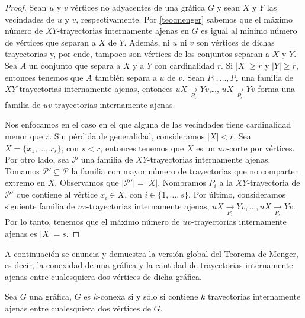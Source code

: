 \begin{proof}
    Sean $u$ y $v$ v\'ertices no adyacentes de una gr\'afica $G$ y sean $X$ y
    $Y$ las vecindades de $u$ y $v$, respectivamente. Por \cref{teo:menger}
    sabemos que el m\'aximo n\'umero de $XY$-trayectorias internamente ajenas en
    $G$ es igual al m\'inimo n\'umero de v\'ertices que separan a $X$ de $Y$.
    Adem\'as, ni $u$ ni $v$ son v\'ertices de dichas trayectorias y, por ende,
    tampoco son v\'ertices de los conjuntos separan a $X$ y $Y$. Sea  $A$ un
    conjunto que separa a $X$ y a $Y$ con cardinalidad $r$. Si $|X| \geq r$ y
    $|Y| \geq r$, entonces tenemos que $A$ tambi\'en separa a $u$ de $v$. Sean
    $P_1, \dots, P_r$ una familia de $XY$-trayectorias internamente ajenas,
    entonces $uX\xrightarrow[P_1]{}Yv$,\dots, $uX\xrightarrow[P_r]{}Yv$ forma
    una familia de $uv$-trayectorias internamente ajenas. 

    Nos enfocamos en el caso en el que alguna de las vecindades tiene
    cardinalidad menor que $r$.  Sin p\'erdida de generalidad, consideramos
    $|X|<r$. Sea $X = \{x_1, \dots, x_s\}$, con $s<r$, entonces tenemos que $X$
    es un $uv$-corte por v\'ertices. Por otro lado, sea $\mathcal{P}$ una
    familia de $XY$-trayectorias internamente ajenas. Tomamos $\mathcal{P'}
    \subseteq \mathcal{P}$ la familia con mayor n\'umero de trayectorias que no
    comparten extremo en $X$. Observamos que $|\mathcal{P'}| = |X|$. Nombramos
    $P_i$ a la $XY$-trayectoria de $\mathcal{P'}$ que contiene al v\'ertice $x_i
    \in X$, con $i \in \{1, \dots, s\}$. Por \'ultimo, consideramos siguiente
    familia de $uv$-trayectorias internamente ajenas, $uX\xrightarrow[P_1]{}Yv,
    \dots, uX\xrightarrow[P_s]{}Yv$. Por lo tanto, tenemos que el m\'aximo
    n\'umero de $uv$-trayectorias internamente ajenas es $|X|=s$.
\end{proof}


A continuaci\'on  se enuncia y demuestra la versi\'on global del Teorema de
Menger, es decir, la conexidad de una gr\'afica y la cantidad de trayectorias
internamente ajenas entre cualesquiera dos v\'ertices de dicha gr\'afica.

\begin{teorema}
    \label{teo:mengerGen}
     Sea $G$ una gr\'afica, $G$ es $k$-conexa si y s\'olo si contiene
     $k$ trayectorias internamente ajenas entre cualesquiera dos v\'ertices de
     $G$.
 \end{teorema}

